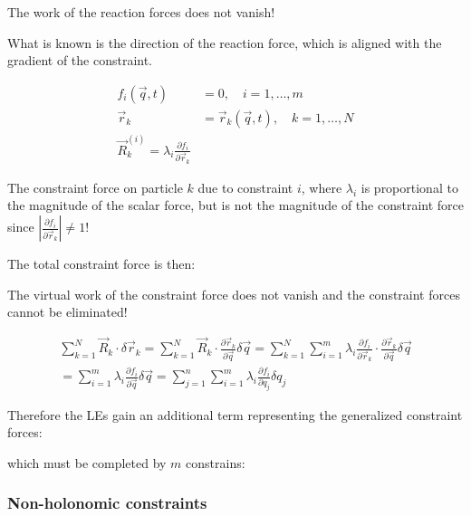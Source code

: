 \documentclass[10pt,a4paper]{scrartcl}
\begin{document}
\begin{multicols*}{2}
The work of the reaction forces does not vanish!

What is known is the direction of the reaction force, which is aligned with the gradient of the constraint.

\begin{align*}
f_i(\vec{q},t)&=0,\quad i=1,\ldots,m\\
\vec{r}_k&=\vec{r}_k(\vec{q},t),\quad k=1,\ldots,N\\
\vec{R}_k^{(i)}=\lambda_i\frac{\partial f_i}{\partial\vec{r}_k}
\end{align*}

The constraint force on particle $k$ due to constraint $i$, where $\lambda_i$ is proportional to the magnitude of the scalar force, but is not the magnitude of the constraint force since $\left|\frac{\partial f_i}{\partial\vec{r}_k}\right|\neq 1$!

The total constraint force is then:


The virtual work of the constraint force does not vanish and the constraint forces cannot be eliminated!

\begin{align*}
\sum\limits_{k=1}^N\vec{R}_k\cdot\delta\vec{r}_k=\sum\limits_{k=1}^N\vec{R}_k\cdot\frac{\partial\vec{r}_k}{\partial\vec{q}}\delta\vec{q}=\sum\limits_{k=1}^N\sum\limits_{i=1}^m\lambda_i\frac{\partial f_i}{\partial\vec{r}_k}\cdot\frac{\partial\vec{r}_k}{\partial \vec{q}}\delta\vec{q}\\
=\sum\limits_{i=1}^m\lambda_i\frac{\partial f_i}{\partial\vec{q}}\delta\vec{q}=\sum\limits_{j=1}^n\sum\limits_{i=1}^m\lambda_i\frac{\partial f_i}{\partial q_j}\delta q_j
\end{align*}

Therefore the LEs gain an additional term representing the generalized constraint forces:


which must be completed by $m$ constrains:


\subsubsection{Non-holonomic constraints}


\end{multicols*}
\end{document}

